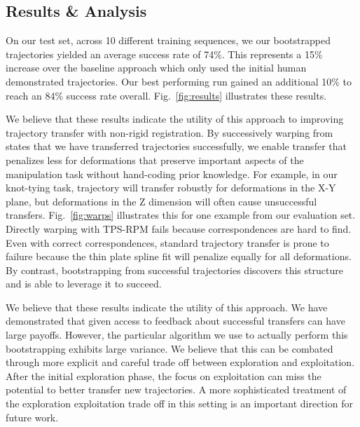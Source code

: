 \subsection{Results & Analysis}

On our test set, across 10 different training sequences, we our bootstrapped trajectories
yielded an average success rate of 74\%. This represents a 15\% increase over the baseline 
approach which only used the initial human demonstrated trajectories. Our best performing
run gained an additional 10\% to reach an 84\% success rate overall. Fig.~\ref{fig:results} 
illustrates these results.

We believe that these results indicate the utility of this approach to improving
trajectory transfer with non-rigid registration. By successively warping from 
states that we have transferred trajectories successfully, we enable transfer
that penalizes less for deformations that preserve important aspects of the manipulation
task without hand-coding prior knowledge. For example, in our knot-tying task, trajectory 
will transfer robustly for deformations in the X-Y plane, but deformations in the Z dimension
will often cause unsuccessful transfers. Fig.~\ref{fig:warps} illustrates this for one
example from our evaluation set. Directly warping with TPS-RPM fails because correspondences 
are hard to find. Even with correct correspondences, standard trajectory transfer is
prone to failure because the thin plate spline fit will penalize equally for all deformations.
By contrast, bootstrapping from successful trajectories discovers this structure
and is able to leverage it to succeed. 

We believe that these results indicate the utility of this approach. We have demonstrated that
given access to feedback about successful transfers can have large payoffs. However,
the particular algorithm we use to actually perform this bootstrapping exhibits large variance.
We believe that this can be combated through more explicit and careful trade off between
exploration and exploitation. After the initial exploration phase, the focus on exploitation
can miss the potential to better transfer new trajectories. A more sophisticated treatment
of the exploration exploitation trade off in this setting is an important direction for future work.

